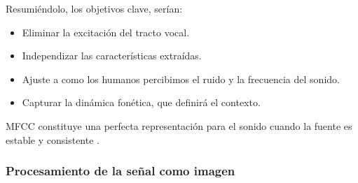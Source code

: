 \documentclass[11pt,a4paper,spanish]{book}
\begin{document}
	Resumiéndolo, los objetivos clave, serían:
	\begin{itemize}
		\item Eliminar la excitación del tracto vocal.
		\item Independizar las características extraídas.
		\item Ajuste a como los humanos percibimos el ruido y la frecuencia del sonido.
		\item Capturar la dinámica fonética, que definirá el contexto.
	\end{itemize}
	MFCC constituye una perfecta representación para el sonido cuando la fuente es estable y consistente \cite{Farouk2014}. 
	

	\subsubsection{Procesamiento de la señal como imagen}
	\label{cap2:spectrograms}

	
\end{document}
